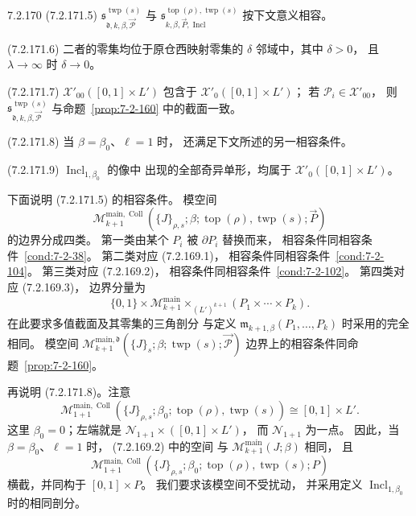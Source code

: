 \begin{proposition}{7.2.170}
\noindent\textup{(7.2.171.5)}\quad
$\mathfrak s_{\mathfrak d,k,\beta,
\vec{\mathcal P}}^{\operatorname{twp}(s)}$
与
$\mathfrak s_{k,\beta,\vec P,
\operatorname{Incl}}^{
\operatorname{top}(\rho),\operatorname{twp}(s)}$
按下文意义相容。

\noindent\textup{(7.2.171.6)}\quad
二者的零集均位于原仓西映射零集的
$\delta$ 邻域中，其中 $\delta>0$，
且 $\lambda\to\infty$ 时 $\delta\to0$。

\noindent\textup{(7.2.171.7)}\quad
$\mathcal X'_{00}([0,1]\times L')$
包含于 $\mathcal X'_0([0,1]\times L')$；
若 $\mathcal P_i\in\mathcal X'_{00}$，
则 $\mathfrak s_{\mathfrak d,k,\beta,
\vec{\mathcal P}}^{\operatorname{twp}(s)}$
与命题~\ref{prop:7-2-160} 中的截面一致。

\noindent\textup{(7.2.171.8)}\quad
当 $\beta=\beta_0$、$\ell=1$ 时，
还满足下文所述的另一相容条件。

\noindent\textup{(7.2.171.9)}\quad
$\operatorname{Incl}_{1,\beta_0}$ 的像中
出现的全部奇异单形，均属于
$\mathcal X'_0([0,1]\times L')$。
\end{proposition}

下面说明 (7.2.171.5) 的相容条件。
模空间
\[
\mathcal M_{k+1}^{\mathrm{main},\operatorname{Coll}}
(\{J\}_{\rho,s};\beta;
\operatorname{top}(\rho),\operatorname{twp}(s);\vec P)
\]
的边界分成四类。
第一类由某个 $P_i$ 被 $\partial P_i$ 替换而来，
相容条件同相容条件~\ref{cond:7-2-38}。
第二类对应 (7.2.169.1)，
相容条件同相容条件~\ref{cond:7-2-104}。
第三类对应 (7.2.169.2)，
相容条件同相容条件~\ref{cond:7-2-102}。
第四类对应 (7.2.169.3)，
边界分量为
\[
\{0,1\}\times\mathcal M_{k+1}^{\mathrm{main}}
\mathbin{\times_{(L')^{k+1}}}
(P_1\times\cdots\times P_k).
\]
在此要求多值截面及其零集的三角剖分
与定义 $\mathfrak m_{k+1,\beta}(P_1,\ldots,P_k)$
时采用的完全相同。
模空间
$\mathcal M_{k+1}^{\mathrm{main},\mathfrak d}
(\{J\}_s;\beta;
\operatorname{twp}(s);\vec{\mathcal P})$
边界上的相容条件同命题~\ref{prop:7-2-160}。

再说明 (7.2.171.8)。注意
\[
\mathcal M_{1+1}^{\mathrm{main},\operatorname{Coll}}
(\{J\}_{\rho,s};\beta_0;
\operatorname{top}(\rho),\operatorname{twp}(s))
\cong[0,1]\times L'.
\]
这里 $\beta_0=0$；左端就是
$\mathcal N_{1+1}\times([0,1]\times L')$，
而 $\mathcal N_{1+1}$ 为一点。
因此，当 $\beta=\beta_0$、$\ell=1$ 时，
(7.2.169.2) 中的空间
与 $\mathcal M_{k+1}^{\mathrm{main}}(J;\beta)$ 相同，
且
\[
\mathcal M_{1+1}^{\mathrm{main},\operatorname{Coll}}
(\{J\}_{\rho,s};\beta_0;
\operatorname{top}(\rho),\operatorname{twp}(s);P)
\]
横截，并同构于 $[0,1]\times P$。
我们要求该模空间不受扰动，
并采用定义
$\operatorname{Incl}_{1,\beta_0}$
时的相同剖分。

